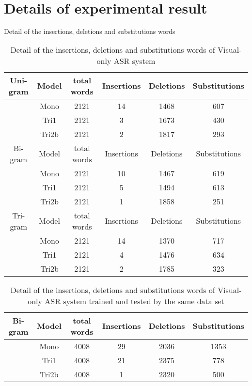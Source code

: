 \chapter{Details of experimental result}

Detail of the insertions, deletions and substitutions words
\begin{table}[ht]
\center
\begin{tabular}{c|c|c|c|c|c}

Uni-gram   & Model & total words& Insertions & Deletions & Substitutions \\ \hline
           & Mono &  2121   &14 &1468 & 607\\ 
           &Tri1 &   2121   &3 &1673 & 430\\ 
           &Tri2b&  2121   &2 &1817 & 293 \\ \hline
Bi-gram   & Model & total words& Insertions & Deletions & Substitutions \\ \hline
           & Mono &  2121   &10 &1467 & 619\\ 
           &Tri1 &   2121   &5 &1494 & 613\\ 
           &Tri2b&  2121   &1 &1858 & 251 \\ \hline
Tri-gram   & Model & total words& Insertions & Deletions & Substitutions \\ \hline
           &Mono &  2121   &14 &1370 & 717\\ 
           &Tri1 &   2121   &4 &1476 & 634\\ 
           &Tri2b&  2121   &2 &1785 & 323 \\ \hline

\end{tabular}
\caption{Detail of the insertions, deletions and substitutions words of Visual-only ASR system}
\label{tab:DV}
\end{table}

\begin{table}[ht]
\center
\begin{tabular}{c|c|c|c|c|c}


Bi-gram   & Model & total words& Insertions & Deletions & Substitutions \\ \hline
           & Mono &  4008   &29 &2036 & 1353\\ 
           &Tri1 &   4008   &21 &2375 & 778\\ 
           &Tri2b&  4008   &1 &2320 & 500 \\ \hline

\end{tabular}
\caption{Detail of the insertions, deletions and substitutions words of Visual-only ASR system trained and tested by the same data set}
\label{tab:DV2}
\end{table}
